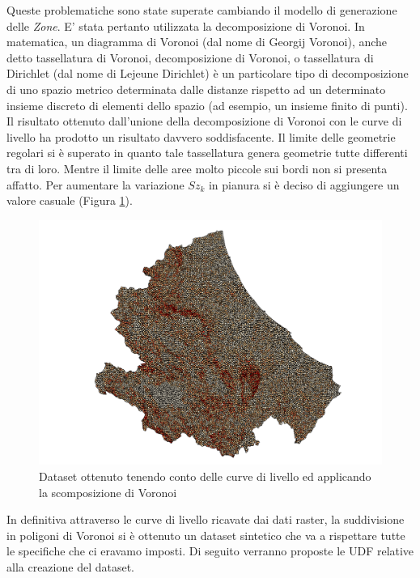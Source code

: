 Queste problematiche sono state superate cambiando il modello di generazione delle \textit{Zone}. E' stata pertanto utilizzata la decomposizione di Voronoi. In matematica, un diagramma di Voronoi (dal nome di Georgij Voronoi), anche detto tassellatura di Voronoi, decomposizione di Voronoi, o tassellatura di Dirichlet (dal nome di Lejeune Dirichlet) è un particolare tipo di decomposizione di uno spazio metrico determinata dalle distanze rispetto ad un determinato insieme discreto di elementi dello spazio (ad esempio, un insieme finito di punti). 
Il risultato ottenuto dall'unione della decomposizione di Voronoi con le curve di livello ha prodotto un risultato davvero soddisfacente. Il limite delle geometrie regolari si è superato in quanto tale tassellatura genera geometrie tutte differenti tra di loro. Mentre il limite delle aree molto piccole sui bordi non si presenta affatto.
Per aumentare la variazione $Sz_k$ in pianura si è deciso di aggiungere un valore casuale (Figura \ref{fig:final_dataset_it_3}).

\begin{figure}[h]
	\centering
	\includegraphics[width=1\textwidth]{images/voronoi.png}
	\caption{Dataset ottenuto tenendo conto delle curve di livello ed applicando la scomposizione di Voronoi}
	\label{fig:final_dataset_it_3}
\end{figure}

In definitiva attraverso le curve di livello ricavate dai dati raster, la suddivisione in poligoni di Voronoi si è ottenuto un dataset sintetico che va a rispettare tutte le specifiche che ci eravamo imposti. Di seguito verranno proposte le UDF relative alla creazione del dataset.

